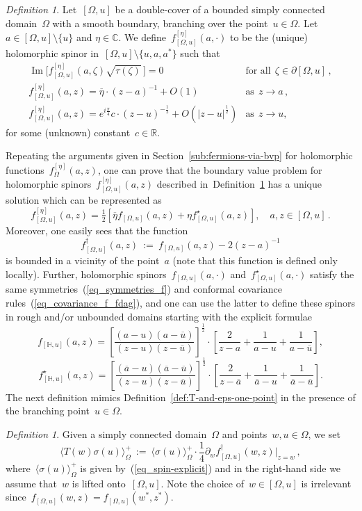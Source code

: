 \documentclass[reqno,11pt,a4paper]{amsart}
\theoremstyle{remark}
\newtheorem{definition}[proposition]{Definition}
\newcommand{\R}{\mathbb{R}}
\renewcommand{\H}{\mathbb{H}}
\newcommand{\OmegaU}{{[\Omega,u]}}
\newcommand{\feta}{f_{\Omega}^{[\eta]}}
\newcommand{\fetaU}{f_\OmegaU^{[\eta]}}
\newcommand{\fU}{f_\OmegaU}
\newcommand{\fstarU}{f^\star_\OmegaU}
\newcommand{\fregU}{\fU^\dag}
\renewcommand\Im{\operatorname{Im}}
\newcommand\Corr[1]{\langle #1 \rangle}
\newcommand\CorrO[2][+]{\Corr{#2}_\Omega^{#1}}
\begin{document}
\begin{definition}
\label{def:fetaU}
Let~$\OmegaU$ be a double-cover of a bounded simply connected domain~$\Omega$ with a smooth boundary, branching over the point~$u\in\Omega$. Let~$a\in\OmegaU\setminus\{u\}$ and $\eta\in \mathbb{C}$. We define~$\fetaU(a,\cdot)$ to be the (unique) holomorphic spinor in~$\OmegaU\setminus\{u,a,a^*\}$ such that
\[
\begin{array}{ll}%
\Im\big[\fetaU (a,\zeta)\sqrt{\tau(\zeta)}\,\big]=0 & \text{for~all}\ \ \zeta\in\partial \OmegaU\,,\\
\fetaU(a,z) = \overline{\eta}\cdot(z-a)^{-1} + O(1) & \text{as}\ \ z\to a\,,\\
\fetaU(a,z) = e^{i\frac{\pi}{4}} c\cdot(z-u)^{-\frac{1}{2}}+O(|z-u|^{\frac{1}{2}}) & \text{as}\ \ z\to u,
\end{array}
\]%
for some (unknown) constant~$c\in\R$.
\end{definition}

Repeating the arguments given in Section~\ref{sub:fermions-via-bvp} for holomorphic functions~$\feta(a,z)$, one can prove that the boundary value problem for holomorphic spinors~$\fetaU(a,z)$ described in~Definition~\ref{def:fetaU} has a unique solution which can be represented as
\[
\fetaU(a,z)  = \tfrac{1}{2}[\overline{\eta} \fU(a,z)  + \eta \fstarU(a,z)],\quad a,z\in\OmegaU\,.
\]
Moreover, one easily sees that the function
\[
\fregU (a,z)~ := ~\fU (a,z) - 2(z\!-\!a)^{-1}
\]
is bounded in a vicinity of the point~$a$ (note that this function is defined only locally). Further, holomorphic spinors~$\fU(a,\cdot)$ and~$\fstarU(a,\cdot)$ satisfy the same symmetries~(\ref{eq_symmetries_f}) and conformal covariance rules~(\ref{eq_covariance_f_fdag}), and one can use the latter to define these spinors in rough and/or unbounded domains starting with the explicit formulae
\[
f_{[\H,u]}(a,z)= \left[\frac{(a-u)(a-\overline{u})}{(z-u)(z-\overline{u})}\right]^{\frac{1}{2}}\cdot \left[\frac{2}{z-a}+\frac{1}{a-u}+\frac{1}{a-\overline{u}}\right],
\]
\[
f^\star_{[\H,u]}(a,z)= \left[\frac{(\overline{a}-u)(\overline{a}-\overline{u})}{(z-u)(z-\overline{u})}\right]^{\frac{1}{2}}\cdot \left[\frac{2}{z-\overline{a}}+\frac{1}{\overline{a}-u}+\frac{1}{\overline{a}-\overline{u}}\right].
\]
The next definition mimics Definition~\ref{def:T-and-eps-one-point} in the presence of the branching point~$u\in\Omega$.
\begin{definition}
\label{def:Tsigma-correlation}
Given a simply connected domain~$\Omega$ and points~$w,u\in\Omega$, we set
\[
\CorrO{T(w)\sigma(u)}~:=~\CorrO{\sigma(u)}\cdot {\textstyle\frac{1}{4}}\partial_w\fregU(w,z)\big|_{z=w}\,,
\]
where~$\CorrO{\sigma(u)}$ is given by~(\ref{eq_spin-explicit}) and in the right-hand side we assume that~$w$ is lifted onto~$\OmegaU$. Note the choice of~$w\in\OmegaU$ is irrelevant since~$\fU(w,z)=\fU(w^*,z^*)$.
\end{definition}
\end{document}
